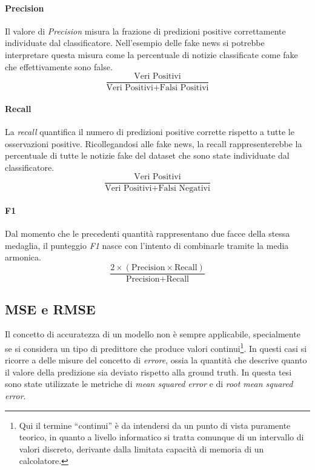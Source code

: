 \documentclass[12pt]{report}
\theoremstyle{definition}
\begin{document}
\paragraph{Precision}
Il valore di \textit{Precision} misura la frazione di predizioni positive correttamente individuate dal classificatore. Nell'esempio delle fake news si potrebbe interpretare questa misura come la percentuale di notizie classificate come fake che effettivamente sono false.
\begin{equation}
\frac{\text{Veri Positivi}}{\text{Veri Positivi} + \text{Falsi Positivi}}
\end{equation}

\paragraph{Recall}
La \textit{recall} quantifica il numero di predizioni positive corrette rispetto a tutte le osservazioni positive. Ricollegandosi alle fake news, la recall rappresenterebbe la percentuale di tutte le notizie fake del dataset che sono state individuate dal classificatore.
\begin{equation}
\frac{\text{Veri Positivi}}{\text{Veri Positivi} + \text{Falsi Negativi}}
\end{equation}

\paragraph{F1}
Dal momento che le precedenti quantità rappresentano due facce della stessa medaglia, il punteggio \textit{F1} nasce con l'intento di combinarle tramite la media armonica.
\begin{equation}
\frac{2 \times (\text{Precision} \times \text{Recall})}{\text{Precision} + \text{Recall}}
\end{equation}

\subsection{MSE e RMSE}\label{erroreregr}
Il concetto di accuratezza di un modello non è sempre applicabile, specialmente se si considera un tipo di predittore che produce valori continui\footnote{Qui il termine ``continui'' è da intendersi da un punto di vista puramente teorico, in quanto a livello informatico si tratta comunque di un intervallo di valori discreto, derivante dalla limitata capacità di memoria di un calcolatore.}. In questi casi si ricorre a delle misure del concetto di \textit{errore}, ossia la quantità che descrive quanto il valore della predizione sia deviato rispetto alla ground truth.
In questa tesi sono state utilizzate le metriche di \textit{mean squared error} e di \textit{root mean squared error}.
\end{document}
